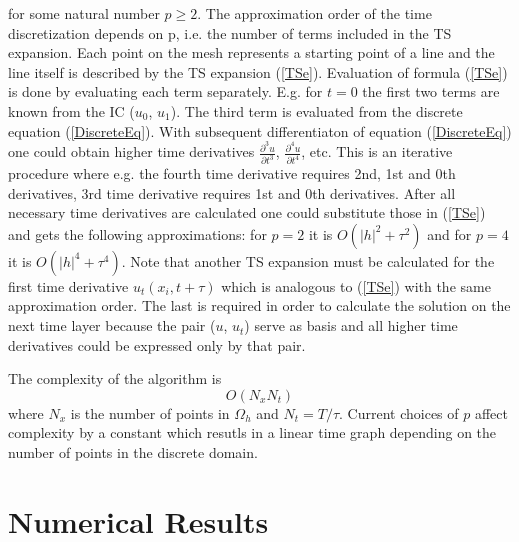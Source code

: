 \documentclass[%
 aip,
cp,  
 amsmath,amssymb,
 reprint,
]{iopconfser}
\newcommand{\rf}[1]{(\ref{#1})}
\begin{document}
for some natural number $p \ge 2$. The approximation order of the time discretization depends on p, i.e. the number of terms included in the TS expansion. Each point on the mesh represents a starting point of a line and the line itself is described by the TS expansion \rf{TSe}. Evaluation of formula \rf{TSe} is done by evaluating each term separately. E.g. for $t=0$ the first two terms are known from the IC ($u_0$, $u_1$). The third term is evaluated from the discrete equation \rf{DiscreteEq}. With subsequent differentiaton of equation \rf{DiscreteEq} one could obtain higher time derivatives $\frac{\partial^3 u}{\partial t^3}$, $\frac{\partial^4 u}{\partial t^4}$, etc. This is an iterative procedure where e.g. the fourth time derivative requires 2nd, 1st and 0th derivatives, 3rd time derivative requires 1st and 0th derivatives. After all necessary time derivatives are calculated one could substitute those in \rf{TSe} and gets the following approximations: for $p=2$ it is $O(|h|^2 + \tau^2)$ and for $p=4$ it is $O(|h|^4 + \tau^4)$. Note that another TS expansion must be calculated for the first time derivative $u_t(x_i, t+\tau)$ which is analogous to \rf{TSe} with the same approximation order. The last is required in order to calculate the solution on the next time layer because the pair ($u$, $u_t$) serve as basis and all higher time derivatives could be expressed only by that pair.

The complexity of the algorithm is
$$ O( N_x  N_t ) $$
where $N_x$ is the number of points in $\Omega_h$ and $N_t = T/\tau$. Current choices of $p$ affect complexity by a constant which resutls in a linear time graph depending on the number of points in the discrete domain.


\section{Numerical Results}
\end{document}
